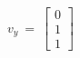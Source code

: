 \documentclass[preview]{standalone}
\begin{document}
\begin{align*}
v_y\ =\ \begin{bmatrix}
                        0\\
                        1\\
                        1
                        \end{bmatrix}\\
\end{align*}
\end{document}
